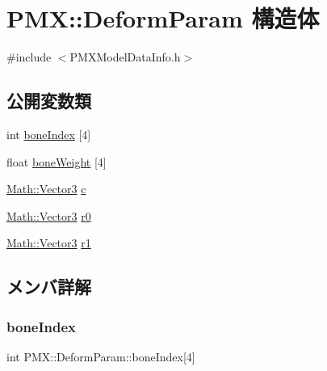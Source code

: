 \hypertarget{struct_p_m_x_1_1_deform_param}{}\section{P\+MX\+:\+:Deform\+Param 構造体}
\label{struct_p_m_x_1_1_deform_param}


{\ttfamily \#include $<$P\+M\+X\+Model\+Data\+Info.\+h$>$}

\subsection*{公開変数類}
\begin{DoxyCompactItemize}
\item 
int \mbox{\hyperlink{struct_p_m_x_1_1_deform_param_ae673ca6b45fc12ac3b8f3586c66bed27}{bone\+Index}} \mbox{[}4\mbox{]}
\item 
float \mbox{\hyperlink{struct_p_m_x_1_1_deform_param_aa77c0447885ad39177495645fa15e180}{bone\+Weight}} \mbox{[}4\mbox{]}
\item 
\mbox{\hyperlink{struct_math_1_1_vector3}{Math\+::\+Vector3}} \mbox{\hyperlink{struct_p_m_x_1_1_deform_param_a1f20dc23ea78cffb1a5dd54770722193}{c}}
\item 
\mbox{\hyperlink{struct_math_1_1_vector3}{Math\+::\+Vector3}} \mbox{\hyperlink{struct_p_m_x_1_1_deform_param_a9f5ac7ddaf3e0528a780a55cde70bbbb}{r0}}
\item 
\mbox{\hyperlink{struct_math_1_1_vector3}{Math\+::\+Vector3}} \mbox{\hyperlink{struct_p_m_x_1_1_deform_param_a448718be916864e9b4c3fc36a1834746}{r1}}
\end{DoxyCompactItemize}


\subsection{メンバ詳解}
\mbox{\label{struct_p_m_x_1_1_deform_param_ae673ca6b45fc12ac3b8f3586c66bed27}} 
\subsubsection{\texorpdfstring{bone\+Index}{boneIndex}}
{\footnotesize\ttfamily int P\+M\+X\+::\+Deform\+Param\+::bone\+Index\mbox{[}4\mbox{]}}


